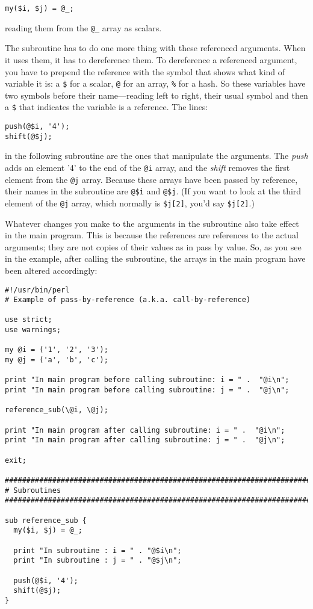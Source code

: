 \begin{lstlisting}
my($i, $j) = @_;
\end{lstlisting}

reading them from the \verb|@_| array as scalars.

The subroutine has to do one more thing with these referenced arguments. When it uses them, it has to dereference them. To dereference a referenced argument, you have to prepend the reference with the symbol that shows what kind of variable it is: a \verb|$| for a scalar, \verb|@| for an array, \verb|%| for a hash. So these variables have two symbols before their name—reading left to right, their usual symbol and then a \verb|$| that indicates the variable is a reference. The lines:

\begin{lstlisting}
push(@$i, '4');
shift(@$j);
\end{lstlisting}

in the following subroutine are the ones that manipulate the arguments.  The \textit{push} adds an element '4' to the end of the \verb|@i| array, and the \textit{shift} removes the first element from the \verb|@j| array. Because these arrays have been passed by reference, their names in the subroutine are \verb|@$i| and \verb|@$j|. (If you want to look at the third element of the \verb|@j| array, which normally is \verb|$j[2]|, you'd say \verb|$j[2]|.)

Whatever changes you make to the arguments in the subroutine also take effect in the main program. This is because the references are references to the actual arguments; they are not copies of their values as in pass by value. So, as you see in the example, after calling the subroutine, the arrays in the main program have been altered accordingly:

\begin{lstlisting}
#!/usr/bin/perl
# Example of pass-by-reference (a.k.a. call-by-reference)

use strict;
use warnings;

my @i = ('1', '2', '3');
my @j = ('a', 'b', 'c');

print "In main program before calling subroutine: i = " .  "@i\n";
print "In main program before calling subroutine: j = " .  "@j\n";

reference_sub(\@i, \@j);

print "In main program after calling subroutine: i = " .  "@i\n";
print "In main program after calling subroutine: j = " .  "@j\n";

exit;

################################################################################
# Subroutines
################################################################################

sub reference_sub {
  my($i, $j) = @_;

  print "In subroutine : i = " . "@$i\n";
  print "In subroutine : j = " . "@$j\n";

  push(@$i, '4');
  shift(@$j);
}
\end{lstlisting}

